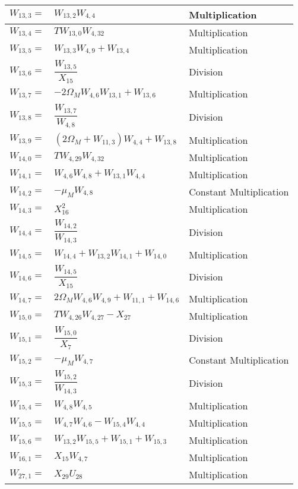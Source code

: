 {\begin{longtable}{|p{1.5cm}|l|p{2cm}|}
$W_{13,3}=$ & $ W_{13,2}W_{4,4} $ & Multiplication \\ \hline
$W_{13,4}=$ & $ T W_{13,0} W_{4,32} $ & Multiplication \\ \hline
$W_{13,5}=$ & $ W_{13,3}W_{4,9}+W_{13,4} $ & Multiplication \\ \hline
$W_{13,6}=$ & $ \dfrac{W_{13,5}}{X_{15}} $ & Division \\ \hline
$W_{13,7}=$ & $ -2\Omega_{M}W_{4,6}W_{13,1}+W_{13,6} $ & Multiplication \\ \hline
$W_{13,8}=$ & $ \dfrac{W_{13,7}}{W_{4,8}} $ & Division \\ \hline
$W_{13,9}=$ & $ \left(2\Omega_{M}+W_{11,3} \right)W_{4,4}+W_{13,8} $ & Multiplication \\ \hline
$W_{14,0}=$ & $ T W_{4,29}W_{4,32} $ & Multiplication \\ \hline
$W_{14,1}=$ & $ W_{4,6}W_{4,8}+W_{13,1}W_{4,4} $ & Multiplication \\ \hline
$W_{14,2}=$ & $ -\mu_{M}W_{4,8} $ & Constant \mbox{Multiplication} \\ \hline
$W_{14,3}=$ & $ X_{16}^{2} $ & Multiplication \\ \hline
$W_{14,4}=$ & $ \dfrac{W_{14,2}}{W_{14,3}} $ & Division \\ \hline
$W_{14,5}=$ & $ W_{14,4}+W_{13,2}W_{14,1}+W_{14,0} $ & Multiplication \\ \hline
$W_{14,6}=$ & $ \dfrac{W_{14,5}}{X_{15}} $ & Division \\ \hline
$W_{14,7}=$ & $ 2\Omega_{M}W_{4,6}W_{4,9}+W_{11,1}+W_{14,6} $ & Multiplication \\ \hline
$W_{15,0}=$ & $ TW_{4,26}W_{4,27}-X_{27} $ & Multiplication \\ \hline
$W_{15,1}=$ & $ \dfrac{W_{15,0}}{X_{7}} $ & Division \\ \hline
$W_{15,2}=$ & $ -\mu_{M}W_{4,7} $ & Constant \mbox{Multiplication} \\ \hline
$W_{15,3}=$ & $ \dfrac{W_{15,2}}{W_{14,3}} $ & Division \\ \hline
$W_{15,4}=$ & $ W_{4,8}W_{4,5} $ & Multiplication \\ \hline
$W_{15,5}=$ & $ W_{4,7}W_{4,6}-W_{15,4}W_{4,4} $ & Multiplication \\ \hline
$W_{15,6}=$ & $ W_{13,2}W_{15,5}+W_{15,1}+W_{15,3} $ & Multiplication \\ \hline
$W_{16,1}=$ & $ X_{15}W_{4,7} $ & Multiplication \\ \hline
$W_{27,1}=$ & $ X_{29}U_{28} $ & Multiplication \\ \hline

\end{longtable}}

